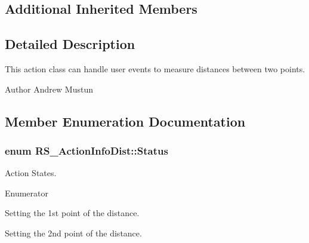 \subsection*{Additional Inherited Members}


\subsection{Detailed Description}
This action class can handle user events to measure distances between two points.

\begin{DoxyAuthor}{Author}
Andrew Mustun 
\end{DoxyAuthor}


\subsection{Member Enumeration Documentation}
\hypertarget{classRS__ActionInfoDist_a5051f099fe74334a55df1d07bd577b6d}{
\subsubsection[{Status}]{\setlength{\rightskip}{0pt plus 5cm}enum {\bf R\-S\-\_\-\-Action\-Info\-Dist\-::\-Status}}}\label{classRS__ActionInfoDist_a5051f099fe74334a55df1d07bd577b6d}
Action States. \begin{Desc}
\item[Enumerator]\par
\begin{description}
\item[{\em 
\hypertarget{classRS__ActionInfoDist_a5051f099fe74334a55df1d07bd577b6dad11cd5eb69aad2b1d44b000572799cc0}{Set\-Point1}\label{classRS__ActionInfoDist_a5051f099fe74334a55df1d07bd577b6dad11cd5eb69aad2b1d44b000572799cc0}
}]Setting the 1st point of the distance. \item[{\em 
\hypertarget{classRS__ActionInfoDist_a5051f099fe74334a55df1d07bd577b6daaea72c14c1abb29d5b997e9ae10289ca}{Set\-Point2}\label{classRS__ActionInfoDist_a5051f099fe74334a55df1d07bd577b6daaea72c14c1abb29d5b997e9ae10289ca}
}]Setting the 2nd point of the distance. \end{description}
\end{Desc}


